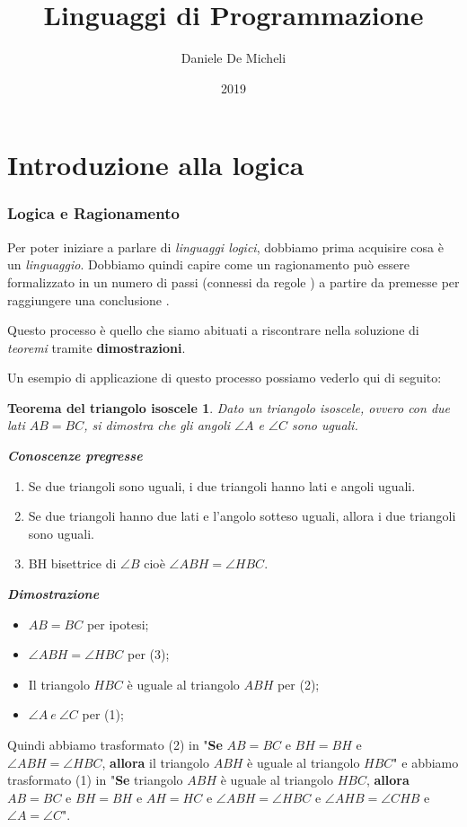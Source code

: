 \documentclass[11pt]{article}
\title{Linguaggi di Programmazione}
\author{Daniele De Micheli}
\date{2019}
\newtheorem*{isoscele}{Teorema del triangolo isoscele}
\begin{document}
\maketitle
\tableofcontents

\part{Introduzione alla logica}
\section{Logica e Ragionamento}
Per poter iniziare a parlare di \textit{linguaggi logici}, dobbiamo prima acquisire cosa è un \textit{linguaggio}.
Dobbiamo quindi capire come un \color{red} ragionamento \color{black} può essere \color{red} formalizzato \color{black} in un numero di \color{red} passi \color{black} (connessi da \color{red} regole \color{black}) a partire da \color{red} premesse \color{black} per raggiungere una \color{red} conclusione \color{black}. 

Questo processo è quello che siamo abituati a riscontrare nella soluzione di \textit{teoremi} tramite \textbf{dimostrazioni}.

Un esempio di applicazione di questo processo possiamo vederlo qui di seguito: 

\begin{isoscele}
Dato un triangolo isoscele, ovvero con due lati $AB = BC$, si dimostra che gli angoli $\angle A$ e $\angle C$ sono uguali.
\end{isoscele}

\textit{\textbf{Conoscenze pregresse}}
\begin{enumerate}
	\item Se due triangoli sono uguali, i due triangoli hanno lati e angoli uguali.
	\item Se due triangoli hanno due lati e l'angolo sotteso uguali, allora i due triangoli sono uguali.
	\item BH bisettrice di $\angle B$ cioè $\angle ABH = \angle HBC$.
\end{enumerate}

\textit{\textbf{Dimostrazione}}
\begin{itemize}
	\item $AB = BC$ per ipotesi;
	\item $\angle ABH = \angle HBC$ per (3);
	\item Il triangolo $HBC$ è uguale al triangolo $ABH$ per (2);
	\item $\angle A \medspace e \medspace \angle C$ per (1); 
\end{itemize}
Quindi abbiamo trasformato (2) in "\textbf{Se} $AB = BC$ e $BH = BH$ e $\angle ABH = \angle HBC$, \textbf{allora} il triangolo $ABH $ è uguale al triangolo $HBC$" e abbiamo trasformato (1) in "\textbf{Se} triangolo $ABH$ è uguale al triangolo $HBC$, \textbf{allora} $AB = BC $ e $ BH = BH $ e $AH = HC $ e $\angle ABH = \angle HBC $ e $\angle AHB = \angle CHB$ e $\angle A = \angle C$".
\end{document}
